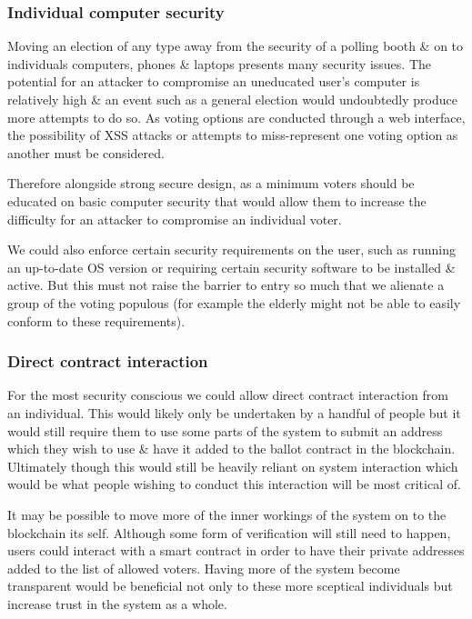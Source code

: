 \documentclass{article}
\begin{document}
	\subsubsection{Individual computer security}
	Moving an election of any type away from the security of a polling booth \& on to individuals computers, phones \& laptops presents many security issues. The potential for an attacker to compromise an uneducated user's computer is relatively high \& an event such as a general election would undoubtedly produce more attempts to do so.	As voting options are conducted through a web interface, the possibility of XSS attacks or attempts to miss-represent one voting option as another must be considered.
	
	Therefore alongside strong secure design, as a minimum voters should be educated on basic computer security that would allow them to increase the difficulty for an attacker to compromise an individual voter.	
	
	We could also enforce certain security requirements on the user, such as running an up-to-date OS version or requiring certain security software to be installed \& active. But this must not raise the barrier to entry so much that we alienate a group of the voting populous (for example the elderly might not be able to easily conform to these requirements).
	
	\subsubsection{Direct contract interaction}
	For the most security conscious we could allow direct contract interaction from an individual. This would likely only be undertaken by a handful of people but it would still require them to use some parts of the system to submit an address which they wish to use \& have it added to the ballot contract in the blockchain. Ultimately though this would still be heavily reliant on system interaction which would be what people wishing to conduct this interaction will be most critical of.
	
	It may be possible to move more of the inner workings of the system on to the blockchain its self. Although some form of verification will still need to happen, users could interact with a smart contract in order to have their private addresses added to the list of allowed voters. Having more of the system become transparent would be beneficial not only to these more sceptical individuals but increase trust in the system as a whole.
    
\end{document}
